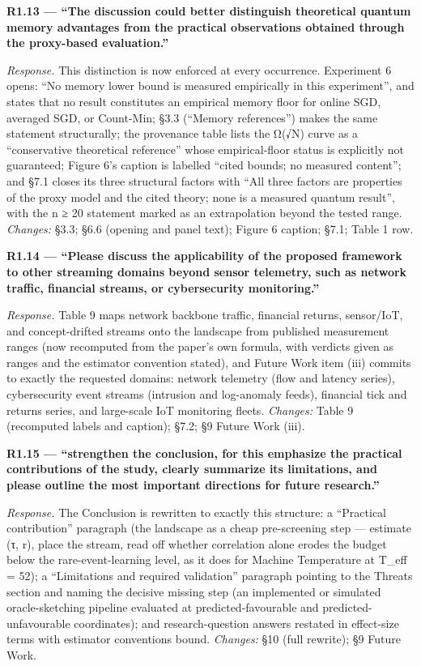 \documentclass[
  11pt,
]{article}
\begin{document}
\textbf{R1.13 --- ``The discussion could better distinguish theoretical
quantum memory advantages from the practical observations obtained
through the proxy-based evaluation.''}

\emph{Response.} This distinction is now enforced at every occurrence.
Experiment 6 opens: ``No memory lower bound is measured empirically in
this experiment'', and states that no result constitutes an empirical
memory floor for online SGD, averaged SGD, or Count-Min; §3.3 (``Memory
references'') makes the same statement structurally; the provenance
table lists the Ω(√N) curve as a ``conservative theoretical reference''
whose empirical-floor status is explicitly not guaranteed; Figure 6's
caption is labelled ``cited bounds; no measured content''; and §7.1
closes its three structural factors with ``All three factors are
properties of the proxy model and the cited theory; none is a measured
quantum result'', with the n ≥ 20 statement marked as an extrapolation
beyond the tested range. \emph{Changes:} §3.3; §6.6 (opening and panel
text); Figure 6 caption; §7.1; Table 1 row.

\textbf{R1.14 --- ``Please discuss the applicability of the proposed
framework to other streaming domains beyond sensor telemetry, such as
network traffic, financial streams, or cybersecurity monitoring.''}

\emph{Response.} Table 9 maps network backbone traffic, financial
returns, sensor/IoT, and concept-drifted streams onto the landscape from
published measurement ranges (now recomputed from the paper's own
formula, with verdicts given as ranges and the estimator convention
stated), and Future Work item (iii) commits to exactly the requested
domains: network telemetry (flow and latency series), cybersecurity
event streams (intrusion and log-anomaly feeds), financial tick and
returns series, and large-scale IoT monitoring fleets. \emph{Changes:}
Table 9 (recomputed labels and caption); §7.2; §9 Future Work (iii).

\textbf{R1.15 --- ``strengthen the conclusion, for this emphasize the
practical contributions of the study, clearly summarize its limitations,
and please outline the most important directions for future research.''}

\emph{Response.} The Conclusion is rewritten to exactly this structure:
a ``Practical contribution'' paragraph (the landscape as a cheap
pre-screening step --- estimate (τ, r), place the stream, read off
whether correlation alone erodes the budget below the
rare-event-learning level, as it does for Machine Temperature at T\_eff
= 52); a ``Limitations and required validation'' paragraph pointing to
the Threats section and naming the decisive missing step (an implemented
or simulated oracle-sketching pipeline evaluated at predicted-favourable
and predicted-unfavourable coordinates); and research-question answers
restated in effect-size terms with estimator conventions bound.
\emph{Changes:} §10 (full rewrite); §9 Future Work.
\end{document}
